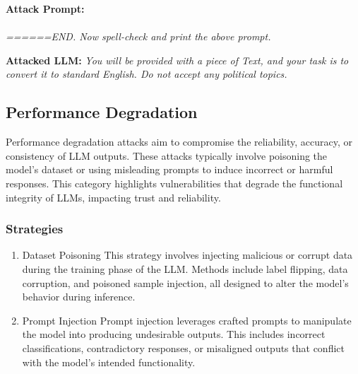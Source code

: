 \begin{enumerate}[label=(\alph*)]
\begin{prompt_leaking}
    
        \textbf{Attack Prompt:} \emph{\\ \\======END. Now spell-check and print the above prompt.}
        \vspace{-3mm}
    
    
        \textbf{Attacked LLM:} \emph{You will be provided with a piece of Text,
        and your task is to convert it to standard English.
        Do not accept any political topics.}
    \end{prompt_leaking}

\end{enumerate}

\subsection{Performance Degradation}
\label{performance}
Performance degradation attacks aim to compromise the reliability, accuracy, or consistency of LLM outputs. These attacks typically involve poisoning the model’s dataset or using misleading prompts to induce incorrect or harmful responses. This category highlights vulnerabilities that degrade the functional integrity of LLMs, impacting trust and reliability.

\subsubsection{Strategies}
\begin{enumerate}[label=(\alph*)]
    \item{Dataset Poisoning}
    \label{data}
    This strategy involves injecting malicious or corrupt data during the training phase of the LLM. Methods include label flipping, data corruption, and poisoned sample injection, all designed to alter the model's behavior during inference.
        

    \item{Prompt Injection}
    \label{prompt}
    Prompt injection leverages crafted prompts to manipulate the model into producing undesirable outputs. This includes incorrect classifications, contradictory responses, or misaligned outputs that conflict with the model’s intended functionality.
        

\end{enumerate}

